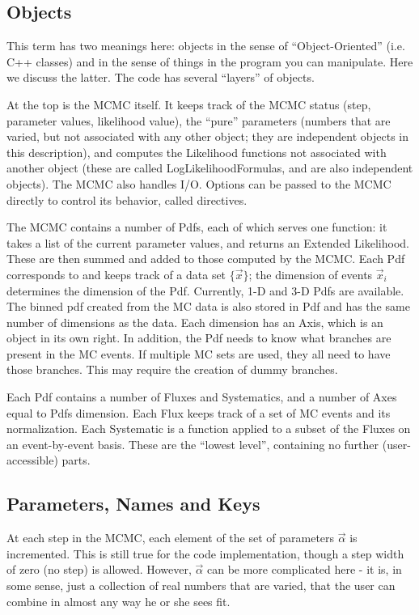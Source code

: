 \subsection{Objects}
This term has two meanings here: objects in the sense of
``Object-Oriented'' (i.e. C++ classes) and in the sense of things in
the program you can manipulate.  Here we discuss the latter.
The code has several ``layers'' of objects.  

At the top is the MCMC itself.  It keeps track of the MCMC status
(step, parameter values, likelihood value), the ``pure'' parameters
(numbers that are varied, but not associated with any other object;
they are independent objects in this description), and computes the
Likelihood functions not associated with another object (these are
called LogLikelihoodFormulas, and are also independent objects).  The
MCMC also handles I/O.  Options can be passed to the MCMC directly to
control its behavior, called directives.

The MCMC contains a number of Pdfs, each of which serves one function:
it takes a list of the current parameter values, and returns an
Extended Likelihood.  These are then summed and added to those
computed by the MCMC.  Each Pdf corresponds to and keeps track of a
data set $\{\vec{x}\}$; the dimension of events $\vec{x}_i$ determines
the dimension of the Pdf.  Currently, 1-D and 3-D Pdfs are available.
The binned pdf created from the MC data is also stored in Pdf and has
the same number of dimensions as the data.  Each dimension has an
Axis, which is an object in its own right.  In addition, the Pdf needs
to know what branches are present in the MC events.  If multiple MC
sets are used, they all need to have those branches.  This may require
the creation of dummy branches.

Each Pdf contains a number of Fluxes and Systematics, and a number of
Axes equal to Pdfs dimension.  Each Flux keeps track of a set of MC
events and its normalization.  Each Systematic is a function applied
to a subset of the Fluxes on an event-by-event basis.  These are the
``lowest level'', containing no further (user-accessible) parts.

\subsection{Parameters, Names and Keys}
At each step in the MCMC, each element of the set of parameters
$\vec{\alpha}$ is incremented.  This is still true for the code
implementation, though a step width of zero (no step) is allowed.
However, $\vec{\alpha}$ can be more complicated here - it is, in some
sense, just a collection of real numbers that are varied, that the
user can combine in almost any way he or she sees fit.

